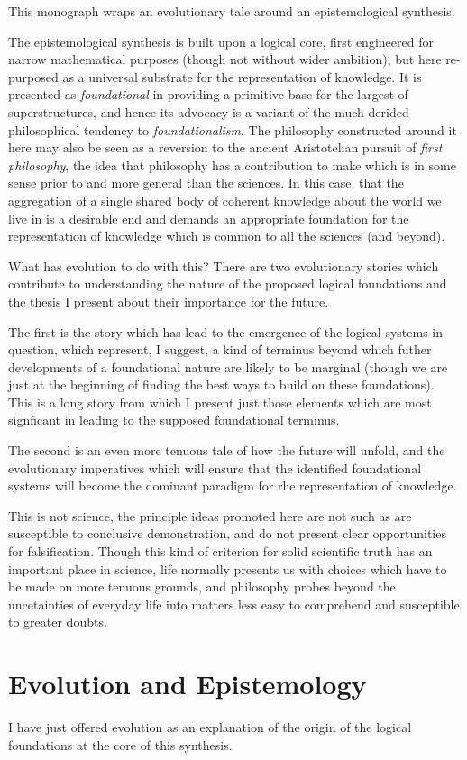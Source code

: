 This monograph wraps an evolutionary tale around an epistemological synthesis.

The epistemological synthesis is built upon a logical core, first engineered for narrow mathematical purposes (though not without wider ambition), but here re-purposed as a universal substrate for the representation of knowledge.
It is presented as \emph{foundational} in providing a primitive base for the largest of superstructures, and hence its advocacy is a variant of the much derided philosophical tendency to \emph{foundationalism}.
The philosophy constructed around it here may also be seen as a reversion to the ancient Aristotelian pursuit of \emph{first philosophy}, the idea that philosophy has a contribution to make which is in some sense prior to and more general than the sciences.
In this case, that the aggregation of a single shared body of coherent knowledge about the world we live in is a desirable end and demands an appropriate foundation for the representation of knowledge which is common to all the sciences (and beyond).

What has evolution to do with this?
There are two evolutionary stories which contribute to understanding the nature of the proposed logical foundations and the thesis I present about their importance for the future.

The first is the story which has lead to the emergence of the logical systems in question, which represent, I suggest, a kind of terminus beyond which futher developments of a foundational nature are likely to be marginal (though we are just at the beginning of finding the best ways to build on these foundations).
This is a long story from which I present just those elements which are most signficant in leading to the supposed foundational terminus.

The second is an even more tenuous tale of how the future will unfold, and the evolutionary imperatives which will ensure that the identified foundational systems will become the dominant paradigm for rhe representation of knowledge.

This is not science, the principle ideas promoted here are not such as are susceptible to conclusive demonstration, and do not present clear opportunities for falsification.
Though this kind of criterion for solid scientific truth has an important place in science, life normally presents us with choices which have to be made on more tenuous grounds, and philosophy probes beyond the uncetainties of everyday life into matters less easy to comprehend and susceptible to greater doubts.

\section{Evolution and Epistemology}

I have just offered evolution as an explanation of the origin of the logical foundations at the core of this synthesis.
